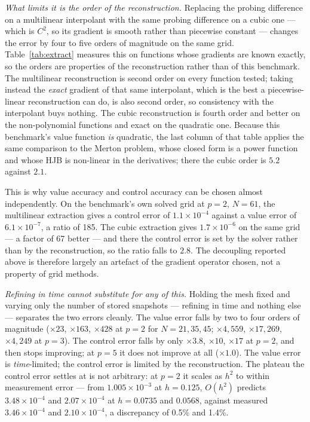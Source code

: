 \documentclass[conference]{IEEEtran}
\begin{document}
\emph{What limits it is the order of the reconstruction.} Replacing the probing difference on a
multilinear interpolant with the same probing difference on a cubic one --- which is $C^2$, so its
gradient is smooth rather than piecewise constant --- changes the error by four to five orders of
magnitude on the same grid. Table~\ref{tab:extract} measures this on functions whose gradients are
known exactly, so the orders are properties of the reconstruction rather than of this benchmark.
The multilinear reconstruction is second order on every function tested; taking instead the
\emph{exact} gradient of that same interpolant, which is the best a piecewise-linear
reconstruction can do, is also second order, so consistency with the interpolant buys nothing. The
cubic reconstruction is fourth order and better on the non-polynomial functions and exact on the
quadratic one. Because this benchmark's value function \emph{is} quadratic, the last column of that
table applies the same comparison to the Merton problem, whose closed form is a power function and
whose HJB is non-linear in the derivatives; there the cubic order is $5.2$ against $2.1$.



This is why value accuracy and control accuracy can be chosen almost independently. On the
benchmark's own solved grid at $p=2$, $N=61$, the multilinear extraction gives a control error of
$1.1\times10^{-4}$ against a value error of $6.1\times10^{-7}$, a ratio of 185. The cubic
extraction gives $1.7\times10^{-6}$ on the same grid --- a factor of 67 better --- and there the
control error is set by the solver rather than by the reconstruction, so the ratio falls to $2.8$.
The decoupling reported above is therefore largely an artefact of the gradient operator chosen, not
a property of grid methods.



\emph{Refining in time cannot substitute for any of this.} Holding the mesh fixed and varying only
the number of stored snapshots --- refining in time and nothing else --- separates the two errors
cleanly. The value error falls by two to four orders of magnitude ($\times23$, $\times163$,
$\times428$ at $p=2$ for $N=21,35,45$; $\times4{,}559$, $\times17{,}269$, $\times4{,}249$ at
$p=3$). The control error falls by only $\times3.8$, $\times10$, $\times17$ at $p=2$, and then
stops improving; at $p=5$ it does not improve at all ($\times1.0$). The value error is
\emph{time}-limited; the control error is limited by the reconstruction. The plateau the control
error settles at is not arbitrary: at $p=2$ it scales as $h^2$ to within measurement error --- from
$1.005\times10^{-3}$ at $h=0.125$, $O(h^2)$ predicts $3.48\times10^{-4}$ and $2.07\times10^{-4}$
at $h = 0.0735$ and $0.0568$, against measured $3.46\times10^{-4}$ and $2.10\times10^{-4}$, a
discrepancy of 0.5\% and 1.4\%.
\end{document}
